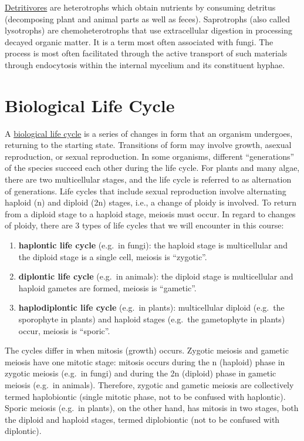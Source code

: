 \href{https://en.wikipedia.org/wiki/Detritivore}{Detritivores} are
heterotrophs which obtain nutrients by consuming detritus (decomposing
plant and animal parts as well as feces). Saprotrophs (also called
lysotrophs) are chemoheterotrophs that use extracellular digestion in
processing decayed organic matter. It is a term most often associated
with fungi. The process is most often facilitated through the active
transport of such materials through endocytosis within the internal
mycelium and its constituent hyphae. 

\section{Biological Life Cycle}\label{biological-life-cycle}

A \href{https://en.wikipedia.org/wiki/Biological_life_cycle}{biological
life cycle} is a series of changes in form that an organism undergoes,
returning to the starting state. Transitions of form may involve growth,
asexual reproduction, or sexual reproduction. In some organisms,
different ``generations'' of the species succeed each other during the
life cycle. For plants and many algae, there are two multicellular
stages, and the life cycle is referred to as alternation of generations.
Life cycles that include sexual reproduction involve alternating haploid
(n) and diploid (2n) stages, i.e., a change of ploidy is involved. To
return from a diploid stage to a haploid stage, meiosis must occur. In
regard to changes of ploidy, there are 3 types of life cycles that we
will encounter in this course:

\begin{enumerate}
\def\labelenumi{\arabic{enumi}.}
\tightlist
\item
  \textbf{haplontic life cycle} (e.g.~in fungi): the haploid stage is
  multicellular and the diploid stage is a single cell, meiosis is
  ``zygotic''.
\item
  \textbf{diplontic life cycle} (e.g.~in animals): the diploid stage is
  multicellular and haploid gametes are formed, meiosis is ``gametic''.
\item
  \textbf{haplodiplontic life cycle} (e.g.~in plants): multicellular
  diploid (e.g.~the sporophyte in plants) and haploid stages (e.g.~the
  gametophyte in plants) occur, meiosis is ``sporic''.
\end{enumerate}

The cycles differ in when mitosis (growth) occurs. Zygotic meiosis and
gametic meiosis have one mitotic stage: mitosis occurs during the n
(haploid) phase in zygotic meiosis (e.g.~in fungi) and during the 2n
(diploid) phase in gametic meiosis (e.g.~in animals). Therefore, zygotic
and gametic meiosis are collectively termed haplobiontic (single mitotic
phase, not to be confused with haplontic). Sporic meiosis (e.g.~in
plants), on the other hand, has mitosis in two stages, both the diploid
and haploid stages, termed diplobiontic (not to be confused with
diplontic).

